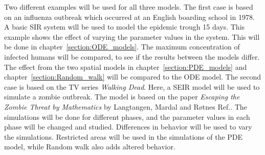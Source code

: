 \documentclass[%
twoside,                 %
final,                   %
chapterprefix=true,      %
open=right               %
10pt]{book}
\begin{document}
\vspace{3mm}




\vspace{3mm}


Two different examples will be used for all three models. The first case is based on an influenza outbreak which occurred at an English boarding school in 1978. A basic SIR system will be used to model the epidemic trough 15 days. This example shows the effect of varying the parameter values in the system. This will be done in chapter~\ref{section:ODE_models}. The maximum concentration of infected humans will be compared, to see if the results between the models differ. The effect from the two spatial models in chapter~\ref{section:PDE_models} and chapter~\ref{section:Random_walk} will be compared to the ODE model. The second case is based on the TV series \emph{Walking Dead}. Here, a SEIR model will be used to simulate a zombie outbreak. The model is based on the paper \emph{Escaping the Zombie Threat by Mathematics} by Langtangen, Mardal and Røtnes Ref.\cite{zombie-math}. The simulations will be done for different phases, and the parameter values in each phase will be changed and studied. Differences in behavior will be used to vary the simulations. Restricted areas will be used in the simulations of the PDE model, while Random walk also adds altered behavior.


\vspace{3mm}




\vspace{3mm}
\end{document}
